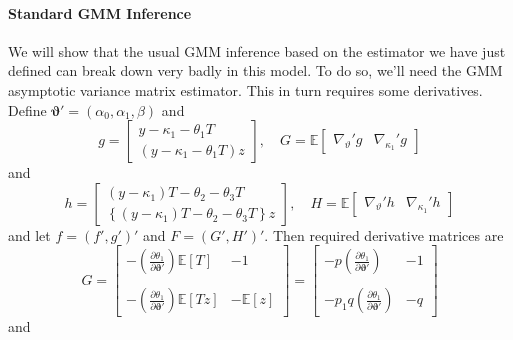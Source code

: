 \documentclass[12pt]{article}
\begin{document}
\paragraph{Standard GMM Inference}
We will show that the usual GMM inference based on the estimator we have just defined can break down very badly in this model.
To do so, we'll need the GMM asymptotic variance matrix estimator.
This in turn requires some derivatives.
Define $\boldsymbol{\vartheta}' = (\alpha_0, \alpha_1, \beta)$ and
\[
  g = \left[
  \begin{array}{c}
    y - \kappa_1 - \theta_1 T\\
    (y - \kappa_1 - \theta_1 T)z
  \end{array}
\right], \quad
G = \mathbb{E}
\left[
\begin{array}{cc}
  \nabla_{\vartheta}' g & \nabla_{\kappa_1}' g
\end{array}
\right]
\]
and
\[
  h = \left[
  \begin{array}{c}
    (y - \kappa_1)T - \theta_2 - \theta_3 T\\
    \left\{  (y - \kappa_1)T - \theta_2 - \theta_3 T \right\} z
  \end{array}
\right], \quad
H = \mathbb{E}
\left[
\begin{array}{cc}
  \nabla_{\vartheta}' h & \nabla_{\kappa_1}' h
\end{array}
\right]
\]
and let $f = (f', g')'$ and $F = (G', H')'$.
Then required derivative matrices are
\[
  G = 
  \left[
  \begin{array}{cc}
    -\left(\displaystyle \frac{\partial \theta_1}{\partial\boldsymbol{\vartheta}'}  \right)\mathbb{E}[T] & -1\\ \\
    -\left( \displaystyle \frac{\partial \theta_1}{\partial\boldsymbol{\vartheta}'}  \right)\mathbb{E}[Tz] & -\mathbb{E}[z]
  \end{array}
\right] = 
  \left[
  \begin{array}{cc}
    -p\left(\displaystyle \frac{\partial \theta_1}{\partial\boldsymbol{\vartheta}'}  \right) & -1\\ \\
    -p_1q\left( \displaystyle \frac{\partial \theta_1}{\partial\boldsymbol{\vartheta}'}  \right) & -q
  \end{array}
\right]
\]
and 
\end{document}
